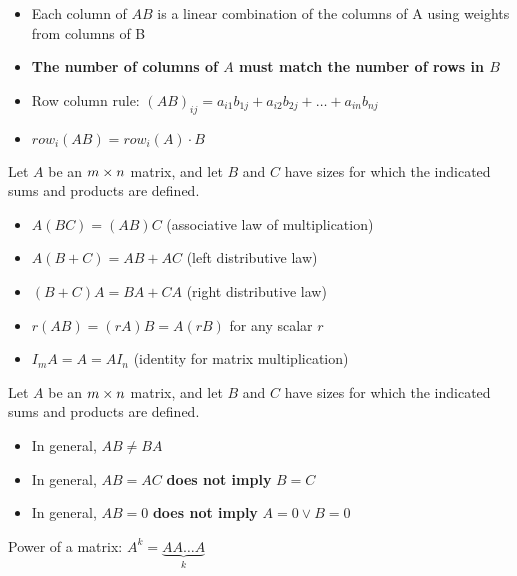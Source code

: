 \documentclass{report}
\begin{document}
\begin{itemize}
\item Each column of $AB$ is a linear combination of the columns of A using weights from columns of B
\item \textbf{The number of columns of $A$ must match the number of rows in $B$ }
\item Row column rule: $(AB)_{ij} = a_{i1}b_{1j} + a_{i2}b_{2j} + \ldots + a_{in}b_{nj}$
\item $row_i(AB) = row_i(A)\cdot B$
\end{itemize}

\begin{theorem}
\end{theorem}
\begin{tcolorbox}[colback=blue!5!white, colframe=blue!75!black, title=Properties of Matrices]
Let $A$ be an $m \times n$ matrix, and let $B$ and $C$ have sizes for which the indicated sums and products are defined.

\begin{itemize}
    \item[] $A(BC) = (AB)C$ \hfill (associative law of multiplication)
    \item[] $A(B + C) = AB + AC$ \hfill (left distributive law)
    \item[] $(B + C)A = BA + CA$ \hfill (right distributive law)
    \item[] $r(AB) = (rA)B = A(rB)$ for any scalar $r$
    \item[] $I_m A = A = A I_n$ \hfill (identity for matrix multiplication)
\end{itemize}
\end{tcolorbox}

\begin{tcolorbox}[colback=blue!5!white, colframe=red!75!black, title=WARNING]
Let $A$ be an $m \times n$ matrix, and let $B$ and $C$ have sizes for which the indicated sums and products are defined.

\begin{itemize}
    \item In general, $AB \ne BA$
    \item In general, $AB = AC$ \textbf{does not imply} $B = C$
    \item In general, $AB = 0$ \textbf{does not imply} $A = 0 \vee B = 0$
\end{itemize}
\end{tcolorbox}

Power of a matrix: $A^k = \underbrace{A A \dots A}_{k}$ \\
\end{document}

